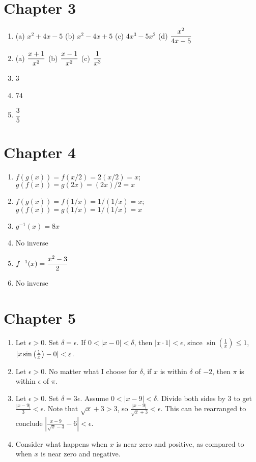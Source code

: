 \section*{Chapter 3}
\twocol
\begin{enumerate}
    \item (a) $x^2+4x-5$ (b) $x^2-4x+5$ (c) $4x^3-5x^2$ (d) $\D\dfrac{x^2}{4x-5}$
    \item (a) $\D\dfrac{x+1}{x^2}$ (b) $\D\dfrac{x-1}{x^2}$ (c) $\D\dfrac{1}{x^3}$
    \item 3
    \item 74
    \item $\dfrac{3}{5}$
\end{enumerate}
\endtwocol

\section*{Chapter 4}
\twocol
\begin{enumerate}
    \item $f(g(x))=f(x/2)=2(x/2)=x$; $g(f(x))=g(2x)=(2x)/2=x$
    \item $f(g(x))=f(1/x)=1/(1/x)=x$; $g(f(x))=g(1/x)=1/(1/x)=x$
    \item $g^{-1}(x)=8x$
    \item No inverse
    \item $f^{-1}(x)=\D\dfrac{x^2-3}{2}$
    \item No inverse
\end{enumerate}
\endtwocol

\section*{Chapter 5}
\twocol
\begin{enumerate}
    \item Let $\epsilon >0$. Set $\delta = \epsilon$. If $0<|x-0| <\delta$,
    then $|x\cdot 1|<\epsilon$, since $\sin\left(\frac{1}{x}\right)\le
    1$, $|x\sin \left( {1\over x}\right)-0|< \epsilon$.
    \item Let $\epsilon > 0$.  No matter what I choose for $\delta$, if $x$ is within $\delta$ of $-2$, then $\pi$ is within $\epsilon$ of $\pi$.
    \item Let $\epsilon > 0$.  Set $\delta = 3\epsilon$.  Assume $0 < |x-9| < \delta$.  Divide both sides by $3$ to get $\frac{|x-9|}{3} < \epsilon$.  Note that $\sqrt{x}+3 > 3$, so $\frac{|x-9|}{\sqrt{x} + 3} < \epsilon$.  This can be rearranged to conclude $\left|\frac{x-9}{\sqrt{x} - 3} - 6\right| < \epsilon$.
    \item Consider what happens when $x$ is near zero and positive, as compared to when $x$ is near zero and negative.
\end{enumerate}
\endtwocol
\clearpage
